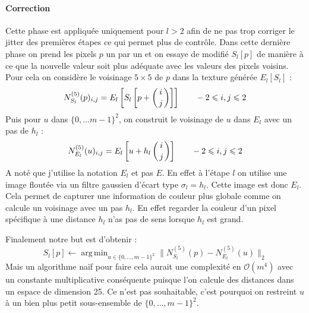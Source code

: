 \documentclass[12pt]{article}
\DeclareMathOperator*{\argmin}{arg\,min}
\begin{document}
\paragraph{Correction}
Cette phase est appliquée uniquement pour $l > 2$ afin de ne pas trop corriger le jitter des premières étapes ce qui permet plus de contrôle. Dans cette dernière phase on prend les pixels $p$ un par un et on essaye de modifié $S_l[p]$ de manière à ce que la nouvelle valeur soit plus adéquate avec les valeurs des pixels voisins. Pour cela on considère le voisinage $5 \times 5$ de $p$ dans la texture générée $E_l[S_l]$ :
$$ N_{S_l}^{(5)}(p)_{i, j} = E_l \left[ S_l \left[ p + \left( i \atop j \right) \right] \right] \qquad -2 \leqslant i, j \leqslant 2 $$
Puis pour $u$ dans $\{ 0, \dots m-1 \}^2$, on construit le voisinage de $u$ dans $E_l$ avec un pas de $h_l$ :
$$ N_{E_l}^{(5)}(u)_{i, j} = E_l \left[ u + h_l \left( i \atop j \right) \right] \qquad -2 \leqslant i, j \leqslant 2 $$
A noté que j'utilise la notation $E_l$ et pas $E$. En effet à l'étape $l$ on utilise une image floutée via un filtre gaussien d'écart type $\sigma_l = h_l$. Cette image est donc $E_l$. Cela permet de capturer une information de couleur plus globale comme on calcule un voisinage avec un pas $h_l$. En effet regarder la couleur d'un pixel spécifique à une distance $h_l$ n'as pas de sens lorsque $h_l$ est grand.

Finalement notre but est d'obtenir :
$$ S_l[p] \gets \argmin_{ u \in \{ 0, \dots, m-1 \}^2 } \| N_{S_l}^{(5)}(p) - N_{E_l}^{(5)}(u) \|_2 $$
Mais un algorithme naïf pour faire cela aurait une complexité en $\mathcal{O}(m^4)$ avec un constante multiplicative conséquente puisque l'on calcule des distances dans un espace de dimension 25. Ce n'est pas souhaitable, c'est pourquoi on restreint $u$ à un bien plus petit sous-ensemble de $\{ 0, \dots, m-1 \}^2$.
\end{document}
